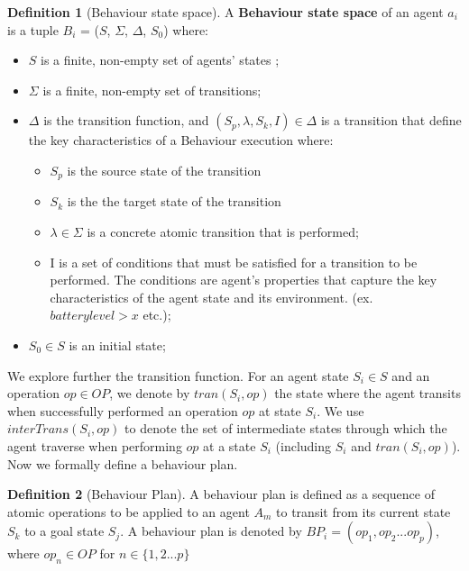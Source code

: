 \documentclass[journal]{IEEEtran}
\theoremstyle{definition}
\newtheorem{definition}{Definition}
\begin{document}
\begin{definition}[Behaviour state space]
A \textbf{Behaviour state space} of an agent $a_i$ is a tuple $B_i$ = ($S$, $\Sigma$, $\Delta $, $S_{0}$)  where: 
\begin{itemize}
\item $S$ is a finite, non-empty set of agents' states ;
\item $\Sigma$ is a finite, non-empty set of transitions;
\item $ \Delta $ is the transition function,
and $(S_p,\lambda,S_k,I) \in \Delta $ is a transition
that define the key characteristics of a Behaviour execution
where:
\begin{itemize}
\item  $S_p$ is the source state of the transition
\item  $S_k$ is the the target state of the transition
\item  $\lambda \in \Sigma$ is a concrete atomic transition that is performed;
\item I is a set of conditions that must be satisfied for a transition to be performed. The conditions are agent's properties that capture the key characteristics of the agent state and its environment.
(ex. $battery level > x$ etc.);
\end{itemize}
\item $S_{0} \in S$ is an initial state;
\end{itemize}
\end{definition}


We explore further the transition function. 
For an agent state $S_i \in S$ and an operation $ op \in  OP$, we denote by $tran(S_i,op )$ the state where the agent transits when successfully performed an operation $ op $ at state $S_i$. We use $ interTrans(S_i,op) $ to denote the set of intermediate states through which the agent traverse when performing $ op $ at a state $S_i$ (including $S_i$ and $tran(S_i,op)$). 
Now we formally define a behaviour plan.

\begin{definition}[Behaviour Plan]  A behaviour plan is defined as a sequence of atomic operations to be applied to an agent $A_m$ to transit from its current state $S_k$ to a goal state $S_j$.  A behaviour plan is denoted by $BP_i= (op_1, op_2 ... op_p)$, where $op_n \in OP $ for $ n \in \{1,2 ... p\} $
\end{definition}
\end{document}
